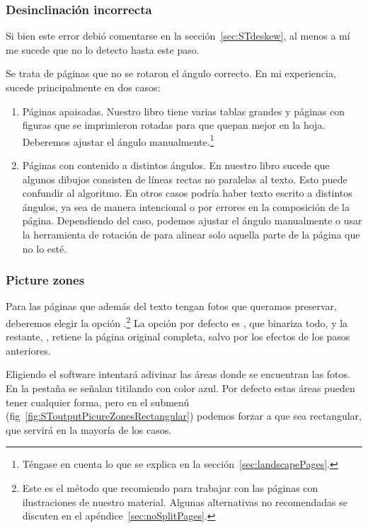 \documentclass[%
	a5paper,
	10pt,
	twoside,
	openright,
	final,
]{memoir}
\begin{document}
	\subsubsection{Desinclinación incorrecta} Si bien este error debió comentarse en la sección~\ref{sec:STdeskew}, al menos a mí me sucede que no lo detecto hasta este paso.

	Se trata de páginas que no se rotaron el ángulo correcto. En mi experiencia, sucede principalmente en dos casos:
	\begin{enumerate}
		\item Páginas apaisadas. Nuestro libro tiene varias tablas grandes y páginas con figuras que se imprimieron rotadas para que quepan mejor en la hoja. Deberemos ajustar el ángulo manualmente.\footnote{Téngase en cuenta lo que se explica en la sección~\ref{sec:landscapePages}.}
		\item Páginas con contenido a distintos ángulos. En nuestro libro sucede que algunos dibujos consisten de líneas rectas no paralelas al texto. Esto puede confundir al algoritmo. En otros casos podría haber texto escrito a distintos ángulos, ya sea de manera intencional o por errores en la composición de la página. Dependiendo del caso, podemos ajustar el ángulo manualmente o usar la herramienta de rotación de \gimp para alinear solo aquella parte de la página que no lo esté.
	\end{enumerate}

	\subsubsection{Picture zones\label{sec:SToutputPictureZones}}

	Para las páginas que además del texto tengan fotos que queramos preservar, deberemos elegir la opción .\footnote{Este es el método que recomiendo para trabajar con las páginas con ilustraciones de nuestro material. Algunas alternativas no recomendadas se discuten en el apéndice~\ref{sec:noSplitPages}.} La opción por defecto es , que binariza todo, y la restante, , retiene la página original completa, salvo por los efectos de los pasos anteriores.

	Eligiendo  el software intentará adivinar las áreas donde se encuentran las fotos. En la pestaña  se señalan titilando con color azul. Por defecto estas áreas pueden tener cualquier forma, pero en el submenú  (fig~\ref{fig:SToutputPicureZonesRectangular}) podemos forzar a que sea rectangular, que servirá en la mayoría de los casos.
\end{document}
